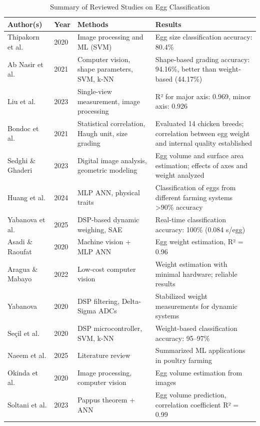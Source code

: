 \documentclass[conference]{IEEEtran}
\begin{document}
	\begin{table}[ht]
		\centering
		\caption{Summary of Reviewed Studies on Egg Classification}
		\begin{tabular}{|p{3cm}|p{1.5cm}|p{6cm}|p{4cm}|}
			\hline
			\textbf{Author(s)} & \textbf{Year} & \textbf{Methods} & \textbf{Results} \\
			\hline
			Thipakorn et al. & 2020 & Image processing and ML (SVM) & Egg size classification accuracy: 80.4\% \\
			\hline
			Ab Nasir et al. & 2021 & Computer vision, shape parameters, SVM, k-NN & Shape-based grading accuracy: 94.16\%, better than weight-based (44.17\%) \\
			\hline
			Liu et al. & 2023 & Single-view measurement, image processing & R² for major axis: 0.969, minor axis: 0.926 \\
			\hline
			Bondoc et al. & 2021 & Statistical correlation, Haugh unit, size grading & Evaluated 14 chicken breeds; correlation between egg weight and internal quality established \\
			\hline
			Sedghi \& Ghaderi & 2023 & Digital image analysis, geometric modeling & Egg volume and surface area estimation; effects of axes and weight analyzed \\
			\hline
			Huang et al. & 2024 & MLP ANN, physical traits & Classification of eggs from different farming systems >90\% accuracy \\
			\hline
			Yabanova et al. & 2025 & DSP-based dynamic weighing, SAE & Real-time classification accuracy: 100\% (0.084 s/egg) \\
			\hline
			Asadi \& Raoufat & 2020 & Machine vision + MLP ANN & Egg weight estimation, R² = 0.96 \\
			\hline
			Aragua \& Mabayo & 2022 & Low-cost computer vision & Weight estimation with minimal hardware; reliable results \\
			\hline
			Yabanova & 2020 & DSP filtering, Delta-Sigma ADCs & Stabilized weight measurements for dynamic systems \\
			\hline
			Seçil et al. & 2020 & DSP microcontroller, SVM, k-NN & Weight-based classification accuracy: 95–97\% \\
			\hline
			Naeem et al. & 2025 & Literature review & Summarized ML applications in poultry farming \\
			\hline
			Okinda et al. & 2020 & Image processing, computer vision & Egg volume estimation from images \\
			\hline
			Soltani et al. & 2023 & Pappus theorem + ANN & Egg volume prediction, correlation coefficient R² = 0.99 \\
			\hline
		\end{tabular}
		\label{tab:study_summary}
	\end{table}
	
\end{document}
